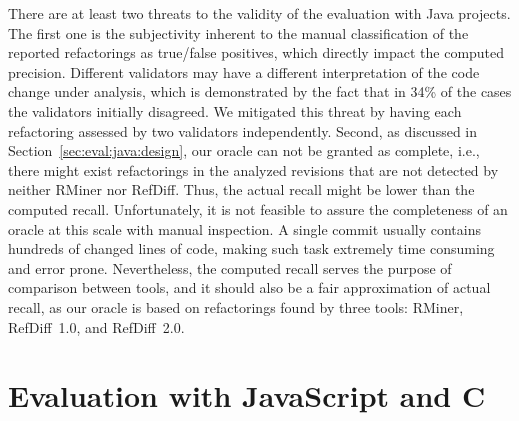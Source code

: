 There are at least two threats to the validity of the evaluation with Java projects.
The first one is the subjectivity inherent to the manual classification of the reported refactorings as true/false positives, which directly impact the computed precision.
Different validators may have a different interpretation of the code change under analysis, which is demonstrated by the fact that in 34\% of the cases the validators initially disagreed.
We mitigated this threat by having each refactoring assessed by two validators independently.
Second, as discussed in Section~\ref{sec:eval:java:design}, our oracle can not be granted as complete, i.e., there might exist refactorings in the analyzed revisions that are not detected by neither RMiner nor RefDiff.
Thus, the actual recall might be lower than the computed recall.
Unfortunately, it is not feasible to assure the completeness of an oracle at this scale with manual inspection.
A single commit usually contains hundreds of changed lines of code, making such task extremely time consuming and error prone.
Nevertheless, the computed recall serves the purpose of comparison between tools, and it should also be a fair approximation of actual recall, as our oracle is based on refactorings found by three tools: RMiner, RefDiff~1.0, and RefDiff~2.0.











\section{Evaluation with JavaScript and C}
\label{sec:eval:js:c}

